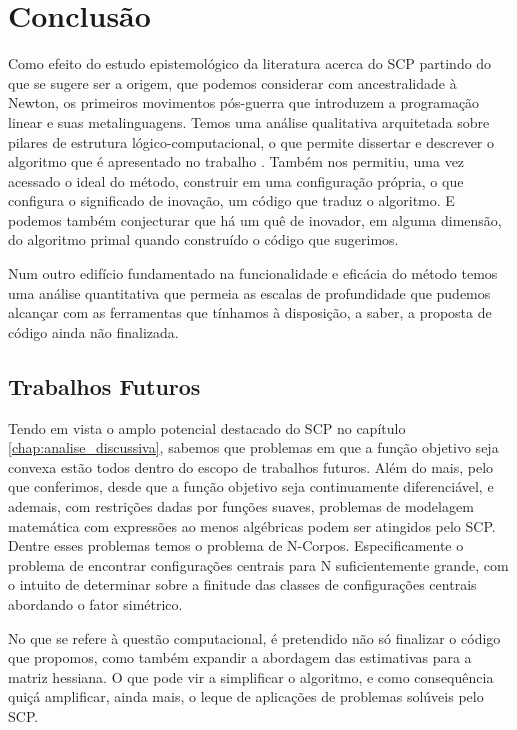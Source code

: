 
\chapter{\larger Conclusão}
\label{chap:conclusao}

Como efeito do estudo epistemológico da literatura acerca do SCP partindo
do que se sugere ser a origem, que podemos considerar com ancestralidade à
Newton, os primeiros movimentos pós-guerra que introduzem a programação linear
e suas metalinguagens. Temos uma análise qualitativa arquitetada sobre pilares
de estrutura lógico-computacional, o que permite dissertar e descrever o
algoritmo que é apresentado no trabalho \cite{Still2010}. Também nos permitiu,
uma vez acessado o ideal do método, construir em uma configuração própria, o
que configura o significado de inovação, um código que traduz o algoritmo.
E podemos também conjecturar que há um quê de inovador, em alguma dimensão,
do algoritmo primal quando construído o código que sugerimos.

Num outro edifício fundamentado na funcionalidade e eficácia do método temos
uma análise quantitativa que permeia as escalas de profundidade que pudemos
alcançar com as ferramentas que tínhamos à disposição, a saber, a proposta de
código ainda não finalizada. 

\section{Trabalhos Futuros}
\label{sec:trabalhosFuturos}

Tendo em vista o amplo potencial destacado do SCP no capítulo
\ref{chap:analise_discussiva}, sabemos que problemas em que a função
objetivo seja convexa estão todos dentro do escopo de trabalhos futuros. Além
do mais, pelo que conferimos, desde que a função objetivo seja continuamente
diferenciável, e ademais, com restrições dadas por funções suaves,
problemas de modelagem matemática com expressões ao menos algébricas podem
ser atingidos pelo SCP. Dentre esses problemas temos o problema de N-Corpos.
Especificamente o problema de encontrar configurações centrais para N
suficientemente grande, com o intuito de determinar sobre a finitude das
classes de configurações centrais abordando o fator simétrico.

No que se refere à questão computacional, é pretendido não só finalizar o
código que propomos, como também expandir a abordagem das estimativas para a
matriz hessiana. O que pode vir a simplificar o algoritmo, e como consequência
quiçá amplificar, ainda mais, o leque de aplicações de problemas solúveis pelo
SCP.

